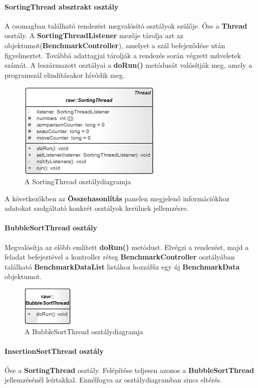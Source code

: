 \documentclass{elteikthesis}
\begin{document}
\paragraph{SortingThread absztrakt osztály}
A csomagban található rendezést megvalósító osztályok szülője. Őse a \textbf{Thread} osztály. A \textbf{SortingThreadListener} mezője tárolja azt az objektumot(\textbf{BenchmarkController}), amelyet a szál befejeződése után figyelmeztet. Továbbá adattagjai tárolják a rendezés során végzett műveletek számát.
A leszármazott osztályai a \textbf{doRun()} metódusát valósítják meg, amely a programszál elindításakor hívódik meg. 
\begin{figure}[H]
	\centering
	\includegraphics{pics/class/SortingThread.png}
	\caption{A SortingThread osztálydiagramja}
\end{figure}
A következőkben az \textbf{Összehasonlítás} panelen megjelenő információkhoz adatokat szolgáltató konkrét osztályok kerülnek jellemzésre.
\paragraph{BubbleSortThread osztály}
Megvalósítja az előbb említett \textbf{doRun()} metódust. Elvégzi a rendezést, majd a feladat befejeztével a kontroller réteg \textbf{BenchmarkController} osztályában található \textbf{BenchmarkDataList} listához hozzáfűz egy új \textbf{BenchmarkData} objektumot.
\begin{figure}[H]
	\centering
	\includegraphics{pics/class/BubbleSortThread.png}
	\caption{A BubbleSortThread osztálydiagramja}
\end{figure}
\paragraph{InsertionSortThread osztály}
Őse a \textbf{SortingThread} osztály. Felépítése teljesen azonos a \textbf{BubbleSortThread} jellemzésénél leírtakkal. Ennélfogva az osztálydiagramban sincs eltérés.
\end{document}
